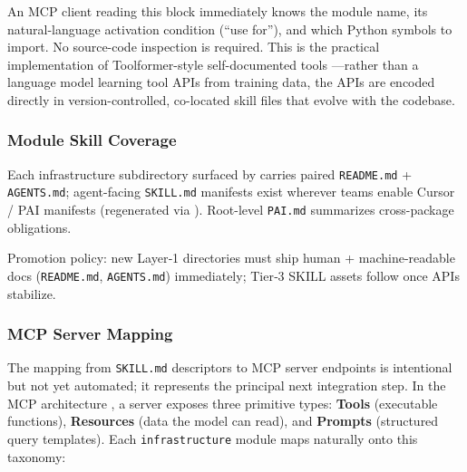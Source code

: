 \documentclass[
]{article}
\begin{document}
An MCP client reading this block immediately knows the module name, its
natural-language activation condition (``use for''), and which Python
symbols to import. No source-code inspection is required. This is the
practical implementation of Toolformer-style self-documented tools
\citep{schick2023toolformer}---rather than a language model learning
tool APIs from training data, the APIs are encoded directly in
version-controlled, co-located skill files that evolve with the
codebase.

\subsubsection{Module Skill Coverage}\label{module-skill-coverage}

Each infrastructure subdirectory surfaced by
 carries paired
\texttt{README.md} + \texttt{AGENTS.md}; agent-facing \texttt{SKILL.md}
manifests exist wherever teams enable Cursor / PAI manifests
(regenerated via ). Root-level
\texttt{PAI.md} summarizes cross-package obligations.

Promotion policy: new Layer‑1 directories must ship human +
machine-readable docs (\texttt{README.md}, \texttt{AGENTS.md})
immediately; Tier‑3 SKILL assets follow once APIs stabilize.

\subsubsection{MCP Server Mapping}\label{mcp-server-mapping}

The mapping from \texttt{SKILL.md} descriptors to MCP server endpoints
is intentional but not yet automated; it represents the principal next
integration step. In the MCP architecture \citep{anthropic2024mcp}, a
server exposes three primitive types: \textbf{Tools} (executable
functions), \textbf{Resources} (data the model can read), and
\textbf{Prompts} (structured query templates). Each
\texttt{infrastructure} module maps naturally onto this taxonomy:
\end{document}
